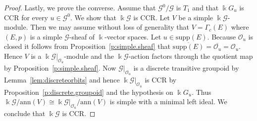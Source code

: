 \documentclass[11pt,reqno]{amsart}
\theoremstyle{plain}
\numberwithin{equation}{section}
\newcommand{\G}[0]{\mathscr{G}}
\newcommand{\orb}[0]{\mathcal{O}}
\begin{document}
\begin{proof}
	Lastly, we prove the converse. Assume that $\G^0/\G$ is $T_1$ and that  $\Bbbk G_u$ is CCR for every $u\in\G^0$. We show that $\Bbbk\G$ is CCR. Let $V$ be a simple $\Bbbk\mathscr G$-module.  Then we may assume without loss of generality that $V=\Gamma_c(E)$ where $(E,p)$ is a simple $\mathscr G$-sheaf of $\Bbbk$-vector spaces.  Let $u\in \mathrm{supp}(E)$.  Because $\orb_u$ is closed it follows from Proposition~\ref{p:simple.sheaf} that $\overline{\mathrm{supp}(E)} = \overline{\orb_u}=\orb_u$.  Hence $V$ is a $\Bbbk \mathscr G|_{\orb_u}$-module and the $\Bbbk\mathscr G$-action factors through the quotient map by Proposition~\ref{p:simple.sheaf}.   Now $\mathscr G|_{\orb_u}$ is a discrete transitive groupoid by Lemma~\ref{lem:discreteorbits} and hence $\Bbbk\mathscr G|_{\orb_u}$ is CCR by Proposition~\ref{p:discrete.groupoid} and the hypothesis on $\Bbbk G_u$.  Thus $\Bbbk\mathscr G/\mathrm{ann}(V)\cong \Bbbk\mathscr G|_{\orb_u}/\mathrm{ann}(V)$  is simple with a minimal left ideal.  We conclude that $\Bbbk\mathscr G$ is CCR.
%
%	

\end{proof}
\end{document}
